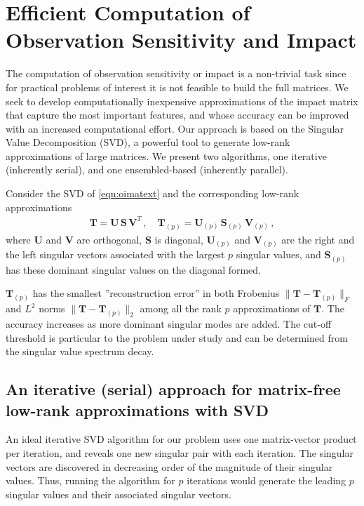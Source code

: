 \documentclass[final,sort&compress]{elsarticle}
\newcommand{\Sm}{\mathbf{S}}
\newcommand{\Vm}{\mathbf{V}}
\newcommand{\Um}{\mathbf{U}}
\newcommand{\T}{\mathbf{T}}
\begin{document}
\section{Efficient Computation of Observation Sensitivity and Impact}\label{sec:lowrank}


The computation of observation sensitivity or impact is a non-trivial task since for practical problems 
of interest it is not feasible to build the full matrices.
We seek to develop computationally inexpensive approximations of the impact matrix that capture 
the most important features, and whose accuracy can be improved with an increased computational effort. 
Our approach is based on the Singular Value Decomposition (SVD), a powerful tool to generate low-rank approximations of large matrices.
We present two algorithms, one iterative (inherently serial), and one ensembled-based (inherently parallel).

Consider the SVD of \eqref{eqn:oimatext} and the corresponding low-rank approximations
\begin{eqnarray*}
\T = \Um\,\Sm\,\Vm^T\,, \quad \T_{(p)} = \Um_{(p)}\,\Sm_{(p)}\,\Vm_{(p)}\,,
\end{eqnarray*}
where $\Um$ and $\Vm$ are orthogonal, $\Sm$ is diagonal,  $\Um_{(p)}$ and $\Vm_{(p)}$ are the right and the left singular vectors 
associated with the largest $p$ singular values, and $\Sm_{(p)}$ has these dominant singular values on the diagonal formed.

$\T_{(p)}$ has the smallest ''reconstruction error'' in both Frobenius $\|\T-\T_{(p)}\|_F$ and $L^2$ norms $\|\T-\T_{(p)}\|_2$ among all the rank $p$ approximations of $\T$. 
The accuracy increases as more dominant singular modes are added.
The cut-off threshold is particular to the problem under study and can be determined from the singular value spectrum decay. 

\subsection{An iterative (serial) approach for matrix-free low-rank approximations with SVD}

An ideal iterative SVD algorithm for our problem uses one matrix-vector product per iteration, 
and reveals one new singular pair with each iteration.
The singular vectors are discovered in decreasing order of the magnitude of their singular values.
Thus, running the algorithm for $p$ iterations would generate the leading $p$ singular values and their associated singular vectors.
\end{document}
